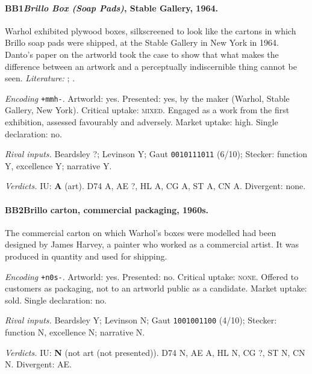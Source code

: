 \paragraph{BB1\enspace \emph{Brillo Box (Soap Pads)}, Stable Gallery, 1964.}
Warhol exhibited plywood boxes, silkscreened to look like the cartons in which Brillo soap pads were shipped, at the Stable Gallery in New York in 1964. Danto's paper on the artworld took the case to show that what makes the difference between an artwork and a perceptually indiscernible thing cannot be seen. \textit{Literature:} \citet{Danto1964}; \citet{Danto1981}.\par
\noindent\textit{Encoding} \texttt{+mmh-}. Artworld: yes. Presented: yes, by the maker (Warhol, Stable Gallery, New York). Critical uptake: \textsc{mixed}. Engaged as a work from the first exhibition, assessed favourably and adversely. Market uptake: high. Single declaration: no.\par
\noindent\textit{Rival inputs.} Beardsley ?; Levinson Y; Gaut \texttt{0010111011} (6/10); Stecker: function Y, excellence Y; narrative Y.\par
\noindent\textit{Verdicts.} IU: \textbf{A} (art). D74 A, AE ?, HL A, CG A, ST A, CN A. Divergent: none.\par

\paragraph{BB2\enspace Brillo carton, commercial packaging, 1960s.}
The commercial carton on which Warhol's boxes were modelled had been designed by James Harvey, a painter who worked as a commercial artist. It was produced in quantity and used for shipping.\par
\noindent\textit{Encoding} \texttt{+n0s-}. Artworld: yes. Presented: no. Critical uptake: \textsc{none}. Offered to customers as packaging, not to an artworld public as a candidate. Market uptake: sold. Single declaration: no.\par
\noindent\textit{Rival inputs.} Beardsley Y; Levinson N; Gaut \texttt{1001001100} (4/10); Stecker: function N, excellence N; narrative N.\par
\noindent\textit{Verdicts.} IU: \textbf{N} (not art (not presented)). D74 N, AE A, HL N, CG ?, ST N, CN N. Divergent: AE.\par

